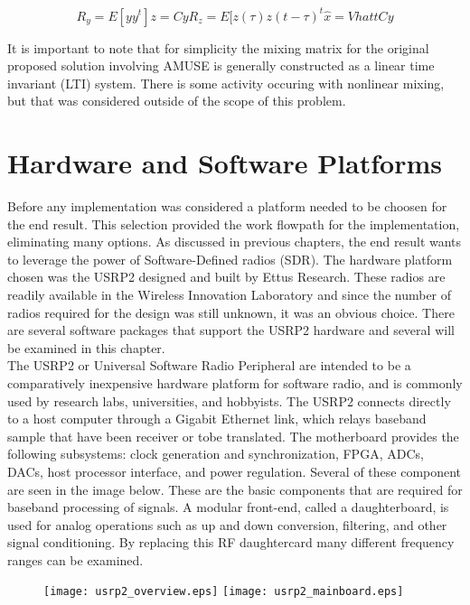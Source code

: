 \begin{equation}\label{}
R_{y}=E[yy^{t}]
z=Cy
R_{z}=E[z(\tau)z(t-\tau)^{t}
\hat{x}=Vhat{t}Cy
\end{equation}

It is important to note that for simplicity the mixing matrix for the original proposed solution involving AMUSE is generally constructed as a linear time invariant (LTI) system.  There is some activity occuring with nonlinear mixing, but that was considered outside of the scope of this problem.\\

\section{Hardware and Software Platforms}

Before any implementation was considered a platform needed to be choosen for the end result.  This selection provided the work flowpath for the implementation, eliminating many options.  As discussed in previous chapters, the end result wants to leverage the power of Software-Defined radios (SDR).  The hardware platform chosen was the USRP2 designed and built by Ettus Research\cite{ettus}.  These radios are readily available in the Wireless Innovation Laboratory and since the number of radios required for the design was still unknown, it was an obvious choice.  There are several software packages that support the USRP2 hardware and several will be examined in this chapter.\\

The USRP2 or Universal Software Radio Peripheral are intended to be a comparatively inexpensive hardware platform for software radio, and is commonly used by research labs, universities, and hobbyists\cite{wired}.  The USRP2 connects directly to a host computer through a Gigabit Ethernet link, which relays baseband sample that have been receiver or tobe translated.   The motherboard provides the following subsystems: clock generation and synchronization, FPGA, ADCs, DACs, host processor interface, and power regulation. Several of these component are seen in the image below.  These are the basic components that are required for baseband processing of signals. A modular front-end, called a daughterboard, is used for analog operations such as up and down conversion, filtering, and other signal conditioning. By replacing this RF daughtercard many different frequency ranges can be examined.\\

\begin{figure}
\texttt{[image: usrp2\_overview.eps]}
\texttt{[image: usrp2\_mainboard.eps]}
\end{figure}


